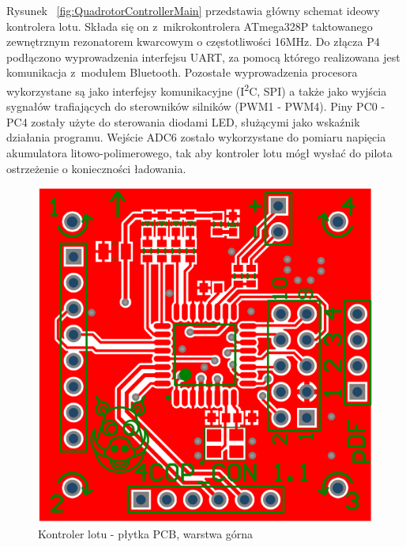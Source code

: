 \documentclass[11pt, twoside]{Thesis} %
\begin{document}
Rysunek ~\ref{fig:QuadrotorControllerMain} przedstawia główny schemat ideowy kontrolera lotu. Składa się on z~mikrokontrolera ATmega328P taktowanego zewnętrznym rezonatorem kwarcowym o częstotliwości 16MHz. Do złącza P4 podłączono wyprowadzenia interfejsu UART, za pomocą którego realizowana jest komunikacja z~modułem Bluetooth. Pozostałe wyprowadzenia procesora wykorzystane są jako interfejsy komunikacyjne (I\textsuperscript{2}C, SPI) a także jako wyjścia sygnałów trafiających do sterowników silników (PWM1 - PWM4). Piny PC0 - PC4 zostały użyte do sterowania diodami LED, służącymi jako wskaźnik działania programu. Wejście ADC6 zostało wykorzystane do pomiaru napięcia akumulatora litowo-polimerowego, tak aby kontroler lotu mógł wysłać do pilota ostrzeżenie o konieczności ładowania. 

\begin{figure}[H]
	\centering
	\includegraphics[scale=0.24]{Pictures/QuadrotorControllerPCB_TOP.png}
		\caption[Kontroler lotu - płytka PCB, warstrwa górna]{Kontroler lotu - płytka PCB, warstwa górna}
	\label{fig:QuadrotorControllerPCB_TOP}
\end{figure}
\end{document}
